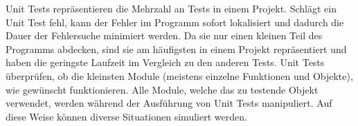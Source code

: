 Unit Tests repräsentieren die Mehrzahl an Tests in einem Projekt. Schlägt ein Unit Test fehl, 
kann der Fehler im Programm sofort lokalisiert und dadurch die Dauer der Fehlersuche minimiert werden.
Da sie nur einen kleinen Teil des Programms abdecken, 
sind sie am häufigsten in einem Projekt repräsentiert und haben die geringste Laufzeit im Vergleich zu den anderen Tests.
Unit Tests überprüfen, ob die kleinsten Module (meistens einzelne Funktionen und Objekte), 
wie gewünscht funktionieren. 
Alle Module, welche das zu testende Objekt verwendet, werden während der Ausführung von Unit Tests manipuliert.
Auf diese Weise können diverse Situationen simuliert werden.